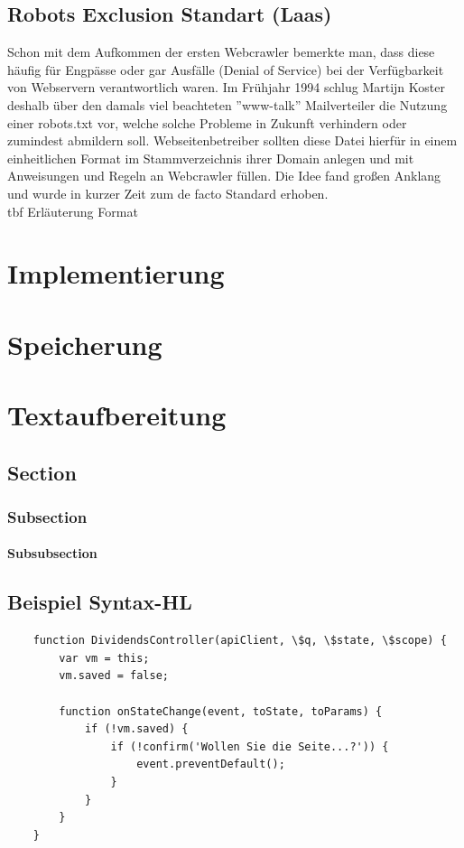 \documentclass[chapterprefix=false, 12pt, a4paper, oneside, parskip=half, listof=totoc, bibliography=totoc, numbers=noendperiod]{scrbook}
\begin{document}
\section{Robots Exclusion Standart (Laas)}
Schon mit dem Aufkommen der ersten Webcrawler bemerkte man, dass diese häufig für Engpässe oder gar Ausfälle (Denial of Service) bei der Verfügbarkeit von Webservern verantwortlich waren. Im Frühjahr 1994 schlug Martijn Koster deshalb über den damals viel beachteten ''www-talk'' Mailverteiler die Nutzung einer robots.txt vor, welche solche Probleme in Zukunft verhindern oder zumindest abmildern soll. Webseitenbetreiber sollten diese Datei hierfür in einem einheitlichen Format im Stammverzeichnis ihrer Domain anlegen und mit Anweisungen und Regeln an Webcrawler füllen. Die Idee fand großen Anklang und wurde in kurzer Zeit zum de facto Standard erhoben.\\
tbf Erläuterung Format

	\chapter{Implementierung}
	\chapter{Speicherung}
	\chapter{Textaufbereitung}
	\section{Section}
	\subsection{Subsection}
	\subsubsection{Subsubsection}

    \section{Beispiel Syntax-HL}
    \begin{verbatim}
    function DividendsController(apiClient, \$q, \$state, \$scope) {
        var vm = this;
        vm.saved = false;

        function onStateChange(event, toState, toParams) {
            if (!vm.saved) {
                if (!confirm('Wollen Sie die Seite...?')) {
                    event.preventDefault();
                }
            }
        }
    }
    \end{verbatim}




\end{document}
